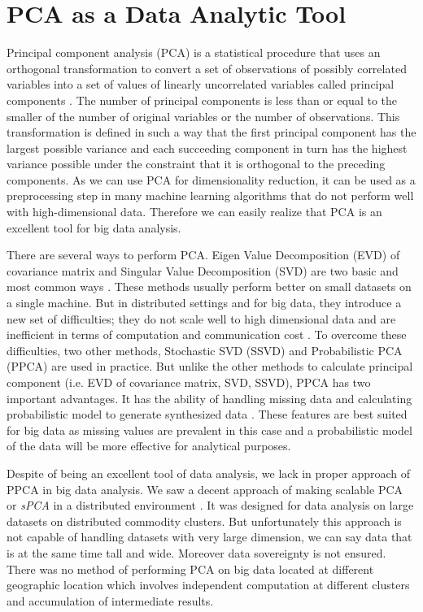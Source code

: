 \chapter{PCA as a Data Analytic Tool}
Principal component analysis (PCA) is a statistical procedure that uses an orthogonal transformation to convert a set of observations of possibly correlated variables into a set of values of linearly uncorrelated variables called principal components \cite{13}. The number of principal components is less than or equal to the smaller of the number of original variables or the number of observations. This transformation is defined in such a way that the first principal component has the largest possible variance and each succeeding component in turn has the highest variance possible under the constraint that it is orthogonal to the preceding components. As we can use PCA for dimensionality reduction, it can be used as a preprocessing step  in many machine learning algorithms that do not perform well with high-dimensional data. Therefore we can easily realize that PCA is an excellent tool for big data analysis. 

There are several ways to perform PCA. Eigen Value Decomposition (EVD) of covariance matrix and Singular Value Decomposition (SVD) are two basic and most common ways \cite{14}. These methods usually perform better on small datasets on a single machine. But in distributed settings and for big data, they introduce a new set of difficulties; they do not scale well to high dimensional data and are inefficient in terms of computation and communication cost \cite{elgamal}. To overcome these difficulties, two other methods, Stochastic SVD (SSVD) \cite{16} and Probabilistic PCA (PPCA) \cite{17} are used in practice. But unlike the other methods to calculate principal component (i.e. EVD of covariance matrix, SVD, SSVD), PPCA has two important advantages. It has the ability of handling missing data and calculating probabilistic model to generate synthesized data \cite{18}. These features are best suited for big data as missing values are prevalent in this case and a probabilistic model of the data will be more effective for analytical purposes.

Despite of being an excellent tool of data analysis, we lack in proper approach of PPCA in big data analysis. We saw a decent approach of making scalable PCA or \textit{sPCA} in a distributed environment  \cite{elgamal}.  It was designed for data analysis on large datasets on distributed commodity clusters. But unfortunately this approach is not capable of handling datasets with very large dimension, we can say data that is at the same time tall and wide. Moreover data sovereignty is not ensured. There was no method of performing PCA on big data located at different geographic location which involves independent computation at different clusters and accumulation of intermediate results. 

